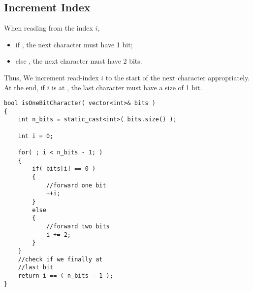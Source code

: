 \subsection{Increment Index}
When reading from the index $i$, 

\begin{itemize}
\item if , the next character must have 1 bit; 
\item else , the next character must have 2 bits.
\end{itemize} 

Thus, We increment read-index $i$ to the start of the next character appropriately. At the end, if $i$ is at , the last character must have a size of 1 bit.

\setcounter{lstlisting}{0}
\begin{lstlisting}[style=customc, caption={Increment Index}]
bool isOneBitCharacter( vector<int>& bits )
{
    int n_bits = static_cast<int>( bits.size() );

    int i = 0;

    for( ; i < n_bits - 1; )
    {
        if( bits[i] == 0 )
        {
            //forward one bit
            ++i;
        }
        else
        {
            //forward two bits
            i += 2;
        }
    }
    //check if we finally at
    //last bit
    return i == ( n_bits - 1 );
}
\end{lstlisting}